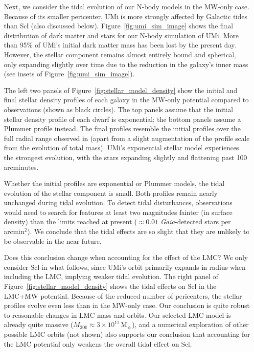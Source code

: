 \documentclass[times,trackchanges, twocolumn, twocolappendix]{aastex701}
\newcommand{\Mo}{\mathrm{M}_\sun}
\newcommand{\jj}{\citetalias{jensen+2024}}
\begin{document}
Next, we consider the tidal evolution of our N-body models in the MW-only case. Because of its smaller pericenter, UMi is more strongly affected by Galactic tides than Scl (also discussed below). Figure~\ref{fig:umi_sim_image} shows the final distribution of dark matter and stars for our N-body simulation of UMi. More than 95\% of UMi's initial dark matter mass has been  lost by the present day. However, the stellar component remains almost entirely bound and spherical, only expanding slightly over time due to the reduction in the galaxy's inner mass (see insets of Figure~\ref{fig:umi_sim_image}). 

The left two panels of Figure~\ref{fig:stellar_model_density} show the initial and final stellar
density profiles of each galaxy in the MW-only potential compared to observations (shown as black circles). The top panels assume that the initial stellar density profile of each dwarf is exponential; the bottom panels assume a Plummer profile instead. The final profiles resemble the initial profiles over the full radial range observed in \jj{} (apart from a slight augmentation of the profile scale from the evolution of total mass). UMi's exponential stellar model experiences the strongest evolution, with the stars expanding slightly and flattening past 100 arcminutes. 

Whether the initial profiles are exponential or Plummer models, the tidal evolution of the stellar component is small. Both profiles remain nearly unchanged during
tidal evolution. To detect tidal disturbances, observations would  need to  search for features at least two magnitudes fainter (in surface density) than the limits reached at present ($\approx 0.01$ \textit{Gaia}-detected stars per arcmin$^2$). We conclude that the tidal effects are so slight that they are unlikely to be observable in the near future.

Does this conclusion change when accounting for the effect of the LMC? We only consider Scl in what follows, since  UMi's orbit primarily expands in radius when including the LMC, implying weaker tidal evolution.
The right panel of Figure~\ref{fig:stellar_model_density} shows the tidal effects on Scl in the LMC+MW potential.
Because of the reduced number of pericenters,
the stellar profiles evolve even less than in the MW-only case. Our conclusion is quite robust to reasonable changes in LMC mass and orbits. Our selected LMC model is already quite massive ($M_{200} \approx 3\times10^{11}\,\Mo$), and a numerical exploration of other possible LMC orbits (not shown) also supports our conclusion that accounting for the LMC potential only weakens the overall tidal effect on Scl.
\end{document}
